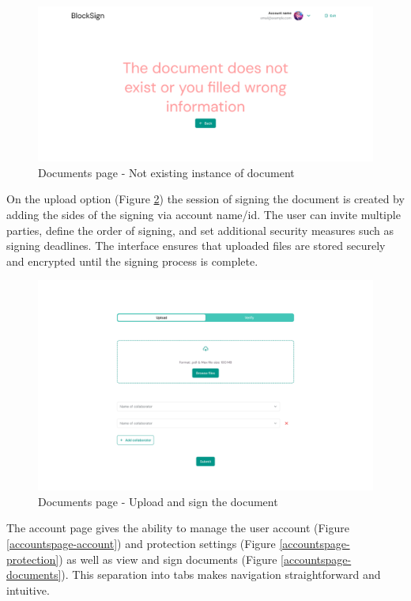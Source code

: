 \begin{figure}[H]
    \centering
    \includegraphics[width=18cm]{"images/figmaUI/unsuccess-crop.png"}
    \caption{Documents page - Not existing instance of document}
    \label{documents-noinstance}
\end{figure}

On the upload option (Figure \ref{documentspage2}) the session of signing the document is created by adding the sides of the signing via account name/id. 
The user can invite multiple parties, define the order of signing, and set additional security measures such as signing deadlines. 
The interface ensures that uploaded files are stored securely and encrypted until the signing process is complete.

\begin{figure}[H]
    \centering
    \includegraphics[width=18cm]{"images/figmaUI/documentspage2-crop.png"}
    \caption{Documents page - Upload and sign the document}
    \label{documentspage2}
\end{figure}

The account page gives the ability to manage the user account (Figure \ref{accountspage-account}) and protection settings (Figure \ref{accountspage-protection}) as well as view and sign documents (Figure \ref{accountspage-documents}). 
This separation into tabs makes navigation straightforward and intuitive. 

